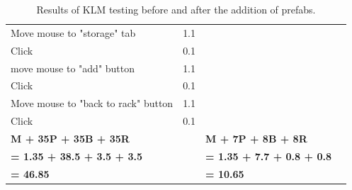 \documentclass[11pt]{article}
\begin{document}
\begin{table}[]
{\begin{tabular}{lrlr}
					Move mouse to "storage" tab              & 1.1       &                                                 &     \\
					Click                                    & 0.1       &                                                 &     \\
					move mouse to "add" button               & 1.1       &                                                 &     \\
					Click                                    & 0.1       &                                                 &     \\
					Move mouse to "back to rack" button      & 1.1       &                                                 &     \\
					Click                                    & 0.1       &                                                 &     \\ \midrule
					\textbf{M + 35P + 35B + 35R}             &           & \textbf{M + 7P + 8B + 8R}                       &     \\
					\textbf{= 1.35 + 38.5 + 3.5 + 3.5}       & \textbf{} & \textbf{= 1.35 + 7.7 + 0.8 + 0.8}               &     \\
					\textbf{= 46.85}                         & \textbf{} & \textbf{= 10.65}                                &     \\ \bottomrule
				\end{tabular}%
				}
				\caption{Results of KLM testing before and after the addition of prefabs.}
				\label{tab:results}
			\end{table}
\end{document}
